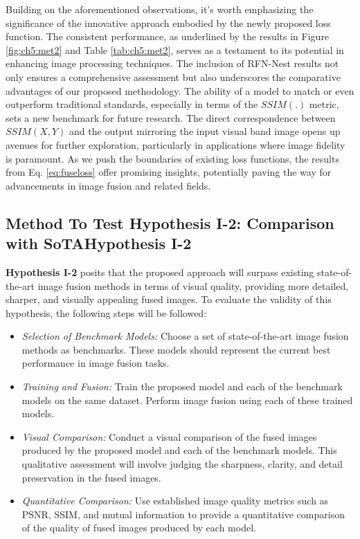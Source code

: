 Building on the aforementioned observations, it's worth emphasizing the significance of the innovative approach embodied by the newly proposed loss function. The consistent performance, as underlined by the results in Figure \ref{fig:ch5:met2} and Table \ref{tab:ch5:met2}, serves as a testament to its potential in enhancing image processing techniques. The inclusion of RFN-Nest results not only ensures a comprehensive assessment but also underscores the comparative advantages of our proposed methodology. The ability of a model to match or even outperform traditional standards, especially in terms of the \(SSIM(.)\) metric, sets a new benchmark for future research. The direct correspondence between \(SSIM(X,Y)\) and the output mirroring the input visual band image opens up avenues for further exploration, particularly in applications where image fidelity is paramount. As we push the boundaries of existing loss functions, the results from Eq. \ref{eq:fuseloss} offer promising insights, potentially paving the way for advancements in image fusion and related fields.

\subsection{Method To Test Hypothesis I-2: Comparison with SoTAHypothesis I-2} \label{subsec:met9}

\textbf{Hypothesis I-2} posits that the proposed approach will surpass existing state-of-the-art image fusion methods in terms of visual quality, providing more detailed, sharper, and visually appealing fused images. To evaluate the validity of this hypothesis, the following steps will be followed:

\begin{itemize}
    \item \textit{Selection of Benchmark Models:} Choose a set of state-of-the-art image fusion methods as benchmarks. These models should represent the current best performance in image fusion tasks.

    \item \textit{Training and Fusion:} Train the proposed model and each of the benchmark models on the same dataset. Perform image fusion using each of these trained models.

    \item \textit{Visual Comparison:} Conduct a visual comparison of the fused images produced by the proposed model and each of the benchmark models. This qualitative assessment will involve judging the sharpness, clarity, and detail preservation in the fused images.

    \item \textit{Quantitative Comparison:} Use established image quality metrics such as PSNR, SSIM, and mutual information to provide a quantitative comparison of the quality of fused images produced by each model.

\end{itemize}


